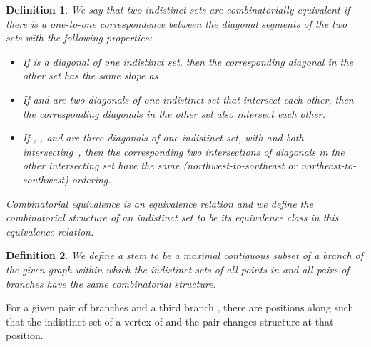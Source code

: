 \documentclass{jgaa-art}
\newtheorem{definition}{Definition}
\begin{document}
\begin{definition}
We say that two indistinct sets are \emph{combinatorially equivalent} if there is a one-to-one correspondence between the diagonal segments of the two sets with the following properties:
\begin{itemize}
\item If  is a diagonal of one indistinct set, then the corresponding diagonal in the other set has the same slope as .
\item If  and  are two diagonals of one indistinct set that intersect each other, then the corresponding diagonals in the other set also intersect each other.
\item If , , and  are three diagonals of one indistinct set, with  and  both intersecting~, then the corresponding two intersections of diagonals in the other intersecting set have the same (northwest-to-southeast or northeast-to-southwest) ordering.
\end{itemize}
Combinatorial equivalence is an equivalence relation and we define the \emph{combinatorial structure} of an indistinct set to be its equivalence class in this equivalence relation.
\end{definition}

\begin{definition}
We define a \emph{stem} to be a maximal contiguous subset of a branch  of the given graph  within which the indistinct sets of all points  in  and all pairs  of branches have the same combinatorial structure.
\end{definition}

\begin{lemma}
\label{lem:const-breaks}
For a given pair of branches  and a third branch , there are  positions along  such that the indistinct set of a vertex  of  and the pair  changes structure at that position.
\end{lemma}
\end{document}
